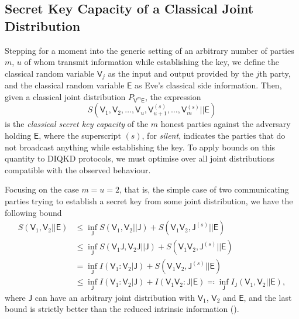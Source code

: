 \documentclass[10pt, a4paper]{article}
\numberwithin{equation}{section} %
\theoremstyle{definition}
\theoremstyle{plain}
\newcommand{\?}{\mathrel{?}} %
\newcommand{\cvec}[1]{\boldsymbol{\mathbf{#1}}}    %
\newcommand{\crv}[1]{\mathsf{#1}}
\begin{document}
                  \subsection{Secret Key Capacity of a Classical Joint Distribution}

                  Stepping for a moment into the generic setting of an arbitrary number of parties \(m\), \(u\) of whom transmit information while establishing the key, we define the classical random variable \(\crv{V}_j\) as the input and output provided by the \(j\)th party, and the classical random variable \(\crv{E}\) as Eve's classical side information. Then, given a classical joint distribution \(P_{\cvec{\crv{V}}^m\crv{E}}\), the expression
                  \begin{equation}
                    S(\crv{V}_1, \crv{V}_2, \ldots, \crv{V}_{u}, \crv{V}_{u+1}^{(s)}, \ldots, \crv{V}_{m}^{(s)} || \crv{E})
                  \end{equation}
                  is the \emph{classical secret key capacity} of the \(m\) honest parties against the adversary holding \(\crv{E}\), where the superscript \((s)\), for \emph{silent}, indicates the parties that do not broadcast anything while establishing the key. To apply bounds on this quantity to DIQKD protocols, we must optimise over all joint distributions compatible with the observed behaviour.


                  \newcommand{\splitkey}[3][\crv{J}]{I_{#1}\left(#2||#3\right)}

                  Focusing on the case \(m = u = 2\), that is, the simple case of two communicating parties trying to establish a secret key from some joint distribution, we have the following bound~\cite[Cor. 2]{ClassicalUpperBounds}
                  \begin{align}
                    S(\crv{V}_1, \crv{V}_2||\crv{E}) &\leq \inf_\crv{J} S(\crv{V}_1, \crv{V}_2||\crv{J}) + S(\crv{V}_1\crv{V}_2, \crv{J}^{(s)}||\crv{E}) \\
                                                     &\leq \inf_\crv{J} S(\crv{V}_1\crv{J}, \crv{V}_2\crv{J}||\crv{J}) + S(\crv{V}_1\crv{V}_2, \crv{J}^{(s)}||\crv{E}) \\
                                                     &= \inf_\crv{J} I(\crv{V}_1 : \crv{V}_2|\crv{J}) + S(\crv{V}_1\crv{V}_2, \crv{J}^{(s)}||\crv{E}) \\
                                                     &\leq \inf_\crv{J} I(\crv{V}_1 : \crv{V}_2|\crv{J}) + I(\crv{V}_1\crv{V}_2 : \crv{J}|\crv{E}) \eqqcolon \inf_{\crv{J}} \splitkey{\crv{V}_1,\crv{V}_2}{\crv{E}},
                  \end{align}
                  where \(\crv{J}\) can have an arbitrary joint distribution with \(\crv{V}_1\), \(\crv{V}_2\) and \(\crv{E}\), and the last bound is strictly better than the reduced intrinsic information ().
\end{document}
